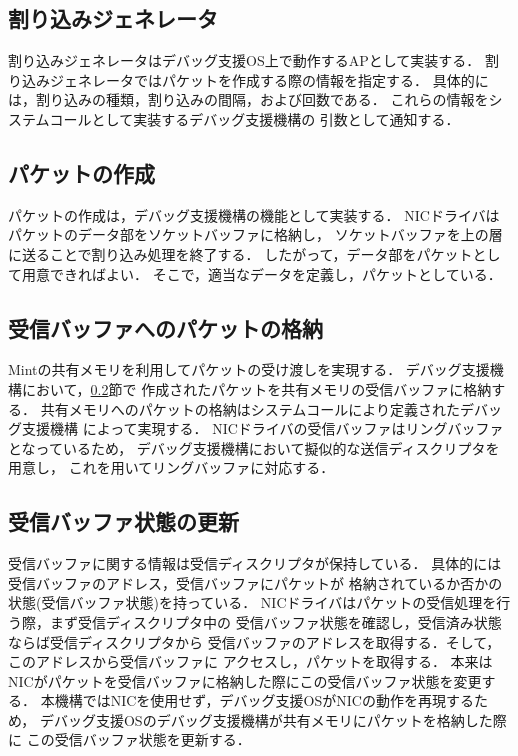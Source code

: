 \documentclass[tanilab-enum]{graduate}
\begin{document}
\subsection{割り込みジェネレータ}
割り込みジェネレータはデバッグ支援OS上で動作するAPとして実装する．
割り込みジェネレータではパケットを作成する際の情報を指定する．
具体的には，割り込みの種類，割り込みの間隔，および回数である．
これらの情報をシステムコールとして実装するデバッグ支援機構の
引数として通知する．

\subsection{パケットの作成}\label{packet}
パケットの作成は，デバッグ支援機構の機能として実装する．
NICドライバはパケットのデータ部をソケットバッファに格納し，
ソケットバッファを上の層に送ることで割り込み処理を終了する．
したがって，データ部をパケットとして用意できればよい．
そこで，適当なデータを定義し，パケットとしている．

\subsection{受信バッファへのパケットの格納}
Mintの共有メモリを利用してパケットの受け渡しを実現する．
デバッグ支援機構において，\ref{packet}節で
作成されたパケットを共有メモリの受信バッファに格納する．
共有メモリへのパケットの格納はシステムコールにより定義されたデバッグ支援機構
によって実現する．
NICドライバの受信バッファはリングバッファとなっているため，
デバッグ支援機構において擬似的な送信ディスクリプタを用意し，
これを用いてリングバッファに対応する．

\subsection{受信バッファ状態の更新}
受信バッファに関する情報は受信ディスクリプタが保持している．
具体的には受信バッファのアドレス，受信バッファにパケットが
格納されているか否かの状態(受信バッファ状態)を持っている．
NICドライバはパケットの受信処理を行う際，まず受信ディスクリプタ中の
受信バッファ状態を確認し，受信済み状態ならば受信ディスクリプタから
受信バッファのアドレスを取得する．そして，このアドレスから受信バッファに
アクセスし，パケットを取得する．
本来はNICがパケットを受信バッファに格納した際にこの受信バッファ状態を変更する．
本機構ではNICを使用せず，デバッグ支援OSがNICの動作を再現するため，
デバッグ支援OSのデバッグ支援機構が共有メモリにパケットを格納した際に
この受信バッファ状態を更新する．
\end{document}
